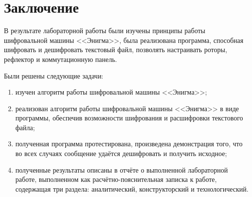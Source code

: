 \chapter*{Заключение}

В результате лабораторной работы были изучены принципы работы шифровальной машины <<Энигма>>, была реализована программа, способная шифровать и дешифровать текстовый файл, позволять настраивать роторы, рефлектор и коммутационную панель. 

Были решены следующие задачи:

\begin{enumerate}[label=\arabic*)]
	\item изучен алгоритм работы шифровальной машины <<Энигма>>;
    \item реализован алгоритм работы шифровальной машины <<Энигма>> в виде программы, обеспечив возможности шифрования и расшифровки текстового файла;
	\item полученная программа протестирована, произведена демонстрация того, что во всех случаях сообщение удаётся дешифровать и получить исходное;
	\item полученные результаты описаны в отчёте о выполненной лабораторной работе, выполненном как расчётно-пояснительная записка к работе, содержащая три раздела: аналитический, конструкторский и технологический.
\end{enumerate}